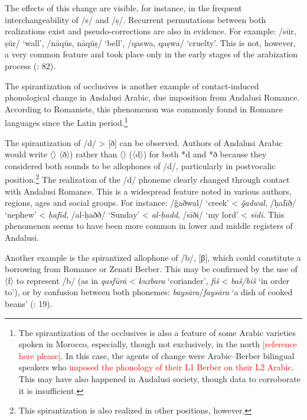 \documentclass[output=paper,modfonts,nonflat]{langsci/langscibook}
\begin{document}
The effects of this change are visible, for instance, in the frequent interchangeability of /s/ and /ṣ/. Recurrent permutations between both realizations exist and pseudo-corrections are also in evidence. For example: /sūr, ṣūr/ ‘wall’, /nāqūs, nāqūṣ/ ‘bell’, /qaswa, qaṣwa/ ‘cruelty’. This is not, however, a very common feature and took place only in the early stages of the arabization process (\citealt{CorrientePereiraVicente2015}: 82). 

The spirantization of occlusives is another example of contact-induced phonological change in Andalusi Arabic, due imposition from Andalusi Romance. According to Romanists, this phenomenon was commonly found in Romance languages since the Latin period.\footnote{The spirantization of the occlusives is also a feature of some Arabic varieties spoken in Morocco, especially, though not exclusively, in the north \textcolor{red}{[reference here please]}.  In this case, the agents of change were Arabic--Berber bilingual speakers who \textcolor{red}{imposed the phonology of their L1 Berber on their L2 Arabic}. This may have also happened in Andalusi society, though data to corroborate it is insufficient.}

The spirantization of /d/ > [ð] can be observed. Authors of Andalusi Arabic would write 〈{}〉 〈ð〉) rather than 〈{}〉 (〈d〉) for both *d and *ð because they considered both sounds to be allophones of /d/, particularly in postvocalic position.\footnote{This spirantization is also realized in other positions, however.}  The realization of the /d/ phoneme clearly changed through contact with Andalusi Romance. This is a widespread feature noted in various authors, regions, ages and social groups. For instance: {} /ǧaðwal/ ‘creek’ < \textit{ǧadwal}, {} /ḥafīð/ ‘nephew’ < \textit{ḥafīd}, {} /al-ḥaðð/ ‘Sunday’ < \textit{al-ḥadd}, {} /sīði/ ‘my lord’ < \textit{sīdi}. This phenomenon seems to have been more common in lower and middle registers of Andalusi. 

Another example is the spirantized allophone of /b/, [β], which could constitute a borrowing from Romance or Zenati Berber. This may be confirmed by the use of 〈f〉 to represent /b/ (as in \textcolor{red}{{}}  \textit{qasfūrā} < \textit{kuzbara} ‘coriander’, \textcolor{red}{{}}  \textit{fiš} < \textit{baš/biš} ‘in order to’), or by confusion between both phonemes: \textit{baysāra}/\textit{faysāra} ‘a dish of cooked beans’ (\citealt{CorrientePereiraVicente2015}: 19).
 
\end{document}
